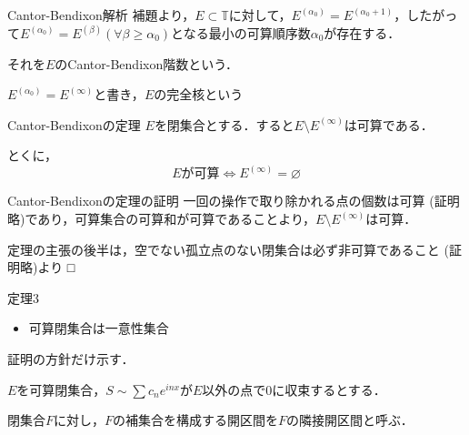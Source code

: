 \documentclass[dvipdfmx,17pt]{beamer}
\theoremstyle{plain}
\newcommand{\R}{\mathbb{R}}
\begin{document}
%
%
%
%
%


\begin{frame}{Cantor-Bendixon解析}
補題より，$E \subset \mathbb{T}$に対して，$E^{(\alpha_0)} = E^{(\alpha_0+1)}$，したがって$E^{(\alpha_0)} = E^{(\beta)} (\forall \beta \geq \alpha_0)$となる最小の可算順序数$\alpha_0$が存在する．

それを$E$のCantor-Bendixon階数という．

$E^{(\alpha_0)} = E^{(\infty)}$と書き，$E$の完全核という
\end{frame}

\begin{frame}{Cantor-Bendixonの定理}
$E$を閉集合とする．すると$E \setminus E^{(\infty)}$は可算である．

とくに，
\[E\text{が可算} \iff E^{(\infty)} = \varnothing\]
\end{frame}

\begin{frame}{Cantor-Bendixonの定理の証明}
一回の操作で取り除かれる点の個数は可算 (証明略)であり，可算集合の可算和が可算であることより，$E \setminus E^{(\infty)}$は可算．

\vspace{0.5cm}
定理の主張の後半は，空でない孤立点のない閉集合は必ず非可算であること (証明略)より □
\end{frame}

\begin{frame}{定理3}
\begin{itemize}
\item 可算閉集合は一意性集合
\end{itemize}

証明の方針だけ示す．

$E$を可算閉集合，$S \sim \sum c_n e^{inx}$が$E$以外の点で$0$に収束するとする．

閉集合$F$に対し，$F$の補集合を構成する開区間を$F$の隣接開区間と呼ぶ．
\end{frame}
\end{document}
